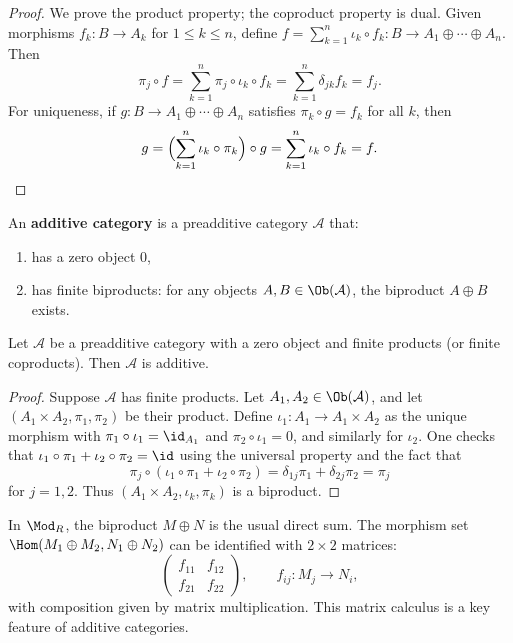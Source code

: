 \begin{proof}
We prove the product property; the coproduct property is dual. Given morphisms
$f_k \colon B \to A_k$ for $1 \leq k \leq n$, define
$f = \sum_{k=1}^n \iota_k \circ f_k \colon B \to A_1 \oplus \cdots \oplus A_n$.
Then
\[
    \pi_j \circ f = \sum_{k=1}^n \pi_j \circ \iota_k \circ f_k
    = \sum_{k=1}^n \delta_{jk} f_k = f_j.
\]
For uniqueness, if $g \colon B \to A_1 \oplus \cdots \oplus A_n$ satisfies
$\pi_k \circ g = f_k$ for all $k$, then
\[
    g = \Bigl(\sum_{k=1}^n \iota_k \circ \pi_k\Bigr) \circ g
    = \sum_{k=1}^n \iota_k \circ f_k = f. \qedhere
\]
\end{proof}

\begin{definition}\label{def:additive-cat}
An \textbf{additive category} is a preadditive category $\mathcal{A}$ that:
\begin{enumerate}
    \item has a zero object $0$,
    \item has finite biproducts: for any objects $A, B \in \Ob(\mathcal{A})$,
    the biproduct $A \oplus B$ exists.
\end{enumerate}
\end{definition}

\begin{proposition}\label{prop:additive-criterion}
Let $\mathcal{A}$ be a preadditive category with a zero object and finite products
(or finite coproducts). Then $\mathcal{A}$ is additive.
\end{proposition}

\begin{proof}
Suppose $\mathcal{A}$ has finite products. Let $A_1, A_2 \in \Ob(\mathcal{A})$,
and let $(A_1 \times A_2, \pi_1, \pi_2)$ be their product. Define
$\iota_1 \colon A_1 \to A_1 \times A_2$ as the unique morphism with
$\pi_1 \circ \iota_1 = \id_{A_1}$ and $\pi_2 \circ \iota_1 = 0$,
and similarly for $\iota_2$. One checks that $\iota_1 \circ \pi_1 + \iota_2 \circ \pi_2 = \id$
using the universal property and the fact that
\[
    \pi_j \circ (\iota_1 \circ \pi_1 + \iota_2 \circ \pi_2) = \delta_{1j}\pi_1 + \delta_{2j}\pi_2 = \pi_j
\]
for $j = 1, 2$. Thus $(A_1 \times A_2, \iota_k, \pi_k)$ is a biproduct.
\end{proof}

\begin{example}\label{ex:biproduct-matrix}
In $\Mod_R$, the biproduct $M \oplus N$ is the usual direct sum. The morphism set
$\Hom(M_1 \oplus M_2, N_1 \oplus N_2)$ can be identified with $2 \times 2$ matrices:
\[
    \begin{pmatrix} f_{11} & f_{12} \\ f_{21} & f_{22} \end{pmatrix},
    \qquad f_{ij} \colon M_j \to N_i,
\]
with composition given by matrix multiplication. This matrix calculus is a key
feature of additive categories.
\end{example}


